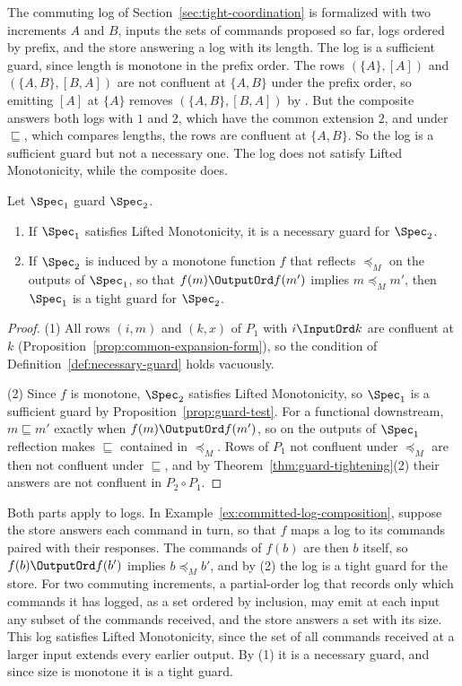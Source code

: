 The commuting log of Section~\ref{sec:tight-coordination} is formalized with
two increments $A$ and $B$, inputs the sets of commands proposed so far, logs
ordered by prefix, and the store answering a log with its length.  The
log is a sufficient guard, since length is monotone in the prefix order.  The rows
$(\{A\},[A])$ and $(\{A,B\},[B,A])$ are not confluent at $\{A,B\}$ under the
prefix order, so emitting $[A]$ at $\{A\}$ removes $(\{A,B\},[B,A])$ by
\commitment.  But the composite answers both logs with $1$ and $2$, which have
the common extension $2$, and under $\sqsubseteq$, which compares lengths, the
rows are confluent at $\{A,B\}$.  So the log is a sufficient guard but not a necessary one.  The log does
not satisfy Lifted Monotonicity, while the composite does.

\begin{proposition}
\label{prop:tight-guards}
Let $\Spec_1$ guard $\Spec_2$.
\begin{enumerate}
  \item If $\Spec_1$ satisfies Lifted Monotonicity, it is a necessary guard
        for $\Spec_2$.
  \item If $\Spec_2$ is induced by a monotone function $f$ that reflects
        $\preceq_M$ on the outputs of $\Spec_1$, so that
        $f(m)\OutputOrd f(m')$ implies $m\preceq_M m'$, then $\Spec_1$ is a
        tight guard for $\Spec_2$.
\end{enumerate}
\end{proposition}

\begin{proof}
(1) All rows $(i,m)$ and $(k,x)$ of $P_1$ with $i\InputOrd k$ are
confluent at $k$ (Proposition~\ref{prop:common-expansion-form}), so the
condition of Definition~\ref{def:necessary-guard} holds vacuously.

(2) Since $f$ is monotone, $\Spec_2$ satisfies Lifted Monotonicity, so
$\Spec_1$ is a sufficient guard by Proposition~\ref{prop:guard-test}.  For a
functional downstream, $m\sqsubseteq m'$ exactly when $f(m)\OutputOrd f(m')$,
so on the outputs of $\Spec_1$ reflection makes $\sqsubseteq$ contained in
$\preceq_M$.  Rows of $P_1$ not confluent under $\preceq_M$ are then
not confluent under $\sqsubseteq$, and by
Theorem~\ref{thm:guard-tightening}(2) their answers are not confluent in
$P_2\circ P_1$.
\end{proof}

Both parts apply to logs.  In Example~\ref{ex:committed-log-composition},
suppose the store answers each command in turn, so that $f$ maps a log to its
commands paired with their responses.  The commands of
$f(b)$ are then $b$ itself, so $f(b)\OutputOrd f(b')$ implies $b\preceq_M b'$, and
by (2) the log is a tight guard for the store.  For two commuting increments,
a partial-order log that records only which commands it has logged, as a set
ordered by inclusion, may emit at each input any subset of the commands
received, and the store answers a set with its size.  This log satisfies
Lifted Monotonicity, since the set of all commands received at a larger input
extends every earlier output.  By (1) it is a necessary guard, and since size
is monotone it is a tight guard.


